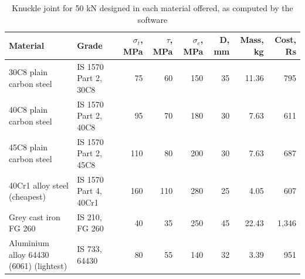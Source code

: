 \begin{table}[htbp]
\centering\footnotesize
\caption{Knuckle joint for 50 kN designed in each material offered, as computed by the software}\label{tab:materials}
\begin{tabularx}{\textwidth}{Xlrrrrrr}
\toprule
Material & Grade & $\sigma_t$, MPa & $\tau$, MPa & $\sigma_c$, MPa & D, mm & Mass, kg & Cost, Rs \\
\midrule
30C8 plain carbon steel & IS 1570 Part 2, 30C8 & 75 & 60 & 150 & 35 & 11.36 & 795 \\
40C8 plain carbon steel & IS 1570 Part 2, 40C8 & 95 & 70 & 180 & 30 & 7.63 & 611 \\
45C8 plain carbon steel & IS 1570 Part 2, 45C8 & 110 & 80 & 200 & 30 & 7.63 & 687 \\
40Cr1 alloy steel (cheapest) & IS 1570 Part 4, 40Cr1 & 160 & 110 & 280 & 25 & 4.05 & 607 \\
Grey cast iron FG 260 & IS 210, FG 260 & 40 & 35 & 250 & 45 & 22.43 & 1,346 \\
Aluminium alloy 64430 (6061) (lightest) & IS 733, 64430 & 80 & 55 & 140 & 32 & 3.39 & 951 \\
\bottomrule
\end{tabularx}
\end{table}
